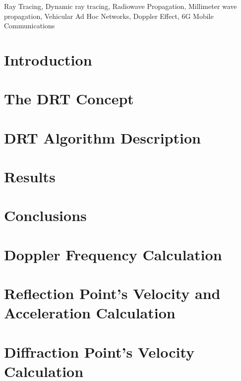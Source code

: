 \documentclass[lettersize,journal]{IEEEtran}
\begin{document}
\begin{IEEEkeywords}
Ray Tracing, Dynamic ray tracing, Radiowave Propagation, Millimeter wave propagation, Vehicular Ad Hoc Networks, Doppler Effect, 6G Mobile Communications
\end{IEEEkeywords}

\section{Introduction}


\section{The DRT Concept}


\section{DRT Algorithm Description}


\section{Results}


\section{Conclusions}



\appendices
\section{Doppler Frequency Calculation}


\section{Reflection Point's Velocity and Acceleration Calculation}


\section{Diffraction Point's Velocity Calculation}



\section*{}

\end{document}
